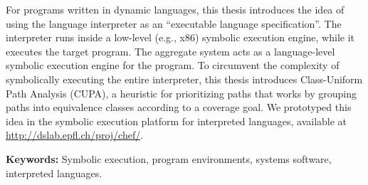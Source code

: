 For programs written in dynamic languages, this thesis introduces the idea of using the language interpreter as an ``executable language specification''.  The interpreter runs inside a low-level (e.g., x86) symbolic execution engine, while it executes the target program.  The aggregate system acts as a language-level symbolic execution engine for the program.
%
To circumvent the complexity of symbolically executing the entire interpreter, this thesis introduces Class-Uniform Path Analysis (CUPA), a heuristic for prioritizing paths that works by grouping paths into equivalence classes according to a coverage goal.
%
We prototyped this idea in the \emph{\chef} symbolic execution platform for interpreted languages, available at {\url{http://dslab.epfl.ch/proj/chef/}}.

\noindent \textbf{Keywords:} Symbolic execution, program environments, systems software, interpreted languages.


